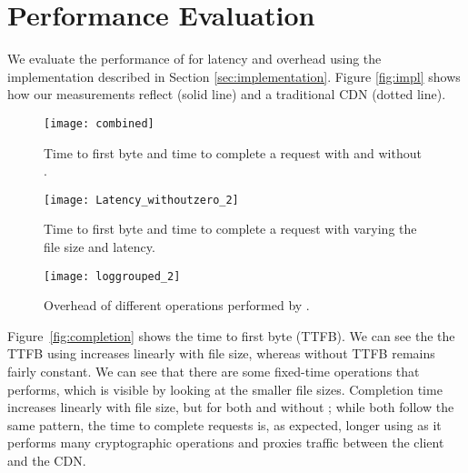 \section{Performance Evaluation}
\label{sec:performance}
We evaluate the performance 
of \system{} for latency and overhead using the implementation 
described in Section \ref{sec:implementation}.  Figure \ref{fig:impl} shows 
how our measurements reflect \system{} (solid line) and a traditional CDN (dotted 
line).  

\begin{figure}[t!]
  \begin{minipage}[t]{.31\linewidth}
    \centering
     \texttt{[image: combined]}
    \caption{Time to first byte and time to complete a request with and without \system{}.}
    \label{fig:completion}
  \end{minipage}
  \hfill
  \begin{minipage}[t]{.29\linewidth}
    \centering
    \texttt{[image: Latency\_withoutzero\_2]}
    \caption{Time to first byte and time to complete a request with varying the file size and latency.}%
    \label{fig:latency}
  \end{minipage}
  \hfill
  \begin{minipage}[t]{.35\linewidth}
    \centering
    \texttt{[image: loggrouped\_2]}
\caption{Overhead of different operations performed by \system{}.}
\label{fig:overhead2}
  \end{minipage}
\end{figure}

Figure~\ref{fig:completion} shows the time to first byte (TTFB).  We can see the the TTFB using \system{} increases linearly with
file size, whereas without \system{} TTFB remains fairly constant.  We can see that there are some fixed-time operations that \system{} performs, which
is visible by looking at the smaller file sizes. Completion time increases linearly
with file size, but for both \system{} and without \system{}; while both follow the
same pattern, the time to complete requests is, as expected, longer using \system{} as it performs many cryptographic operations and proxies traffic between the client and the CDN.


